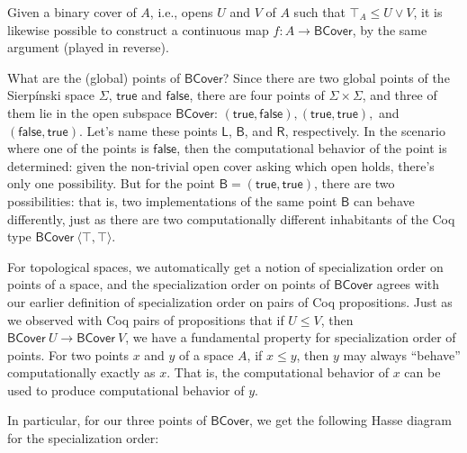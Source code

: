 Given a binary cover of $A$, i.e., opens $U$ and $V$ of $A$ such that $\top_A \le U \vee V$, it is likewise possible to construct a continuous map $f: A \to \mathsf{BCover}$, by the same argument (played in reverse).

What are the (global) points of $\mathsf{BCover}$? Since there are two global points of the Sierp\'inski space $\Sigma$, $\mathsf{true}$ and $\mathsf{false}$, there are four points of $\Sigma \times \Sigma$, and three of them lie in the open subspace $\mathsf{BCover}$: $(\mathsf{true}, \mathsf{false}), (\mathsf{true}, \mathsf{true}),$ and $(\mathsf{false}, \mathsf{true})$. Let's name these points $\mathsf{L}$, $\mathsf{B}$, and $\mathsf{R}$, respectively. In the scenario where one of the points is $\mathsf{false}$, then the computational behavior of the point is determined: given the non-trivial open cover asking which open holds, there's only one possibility. But for the point $\mathsf{B} = (\mathsf{true}, \mathsf{true})$, there are two possibilities: that is, two implementations of the same point $\mathsf{B}$ can behave differently, just as there are two computationally different inhabitants of the Coq type $\mathsf{BCover}\ \langle \top, \top \rangle$.

For topological spaces, we automatically get a notion of specialization order on points of a space, and the specialization order on points of $\mathsf{BCover}$ agrees with our earlier definition of specialization order on pairs of Coq propositions. Just as we observed with Coq pairs of propositions that if $U \le V$, then $\mathsf{BCover}\ U \to \mathsf{BCover}\ V$, we have a fundamental property for specialization order of points. For two points $x$ and $y$ of a space $A$, if $x \le y$, then $y$ may always ``behave'' computationally exactly as $x$. That is, the computational behavior of $x$ can be used to produce computational behavior of $y$.

In particular, for our three points of $\mathsf{BCover}$, we get the following Hasse diagram for the specialization order:
\begin{center}
\end{center}

